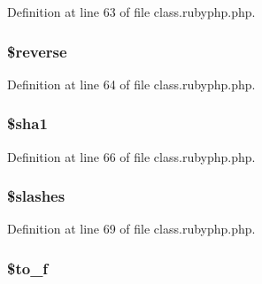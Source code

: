 Definition at line 63 of file class.\-rubyphp.\-php.

\hypertarget{class_pierce_moore_1_1_ruby_p_h_p_1_1r_ae0d210fd358fa750a11e63b26f6d26ea}{
\subsubsection[{\$reverse}]{\setlength{\rightskip}{0pt plus 5cm}\${\bf reverse}}}\label{class_pierce_moore_1_1_ruby_p_h_p_1_1r_ae0d210fd358fa750a11e63b26f6d26ea}


Definition at line 64 of file class.\-rubyphp.\-php.

\hypertarget{class_pierce_moore_1_1_ruby_p_h_p_1_1r_a310d84f0b735d2ab692b4e2acd90e7ef}{
\subsubsection[{\$sha1}]{\setlength{\rightskip}{0pt plus 5cm}\${\bf sha1}}}\label{class_pierce_moore_1_1_ruby_p_h_p_1_1r_a310d84f0b735d2ab692b4e2acd90e7ef}


Definition at line 66 of file class.\-rubyphp.\-php.

\hypertarget{class_pierce_moore_1_1_ruby_p_h_p_1_1r_ac95fd27a35f2d9674ef3760a4ea1d07f}{
\subsubsection[{\$slashes}]{\setlength{\rightskip}{0pt plus 5cm}\${\bf slashes}}}\label{class_pierce_moore_1_1_ruby_p_h_p_1_1r_ac95fd27a35f2d9674ef3760a4ea1d07f}


Definition at line 69 of file class.\-rubyphp.\-php.

\hypertarget{class_pierce_moore_1_1_ruby_p_h_p_1_1r_a85a2ada0b16d9e59f094e77df5848459}{
\subsubsection[{\$to\-\_\-f}]{\setlength{\rightskip}{0pt plus 5cm}\${\bf to\-\_\-f}}}\label{class_pierce_moore_1_1_ruby_p_h_p_1_1r_a85a2ada0b16d9e59f094e77df5848459}


